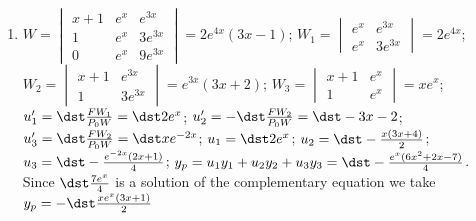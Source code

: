 \documentclass[openany]{book}
\newenvironment{sectionSolutions}{
 \begin{enumerate}[item-label={\thesection.\arabic{enumi}.}]
}{
 \end{enumerate}
}
\begin{document}
\begin{sectionSolutions}
The general solution is
$y=-\dst\frac{x^4+12}{6}+c_1x+c_2x^2+c_3e^x$, so
\[
\begin{bmatrix}y\\y'\\y''
\end{bmatrix}=-
\begin{bmatrix}
(x^4+12)/6\\2x^3/3\\2x^2
\end{bmatrix}+
\begin{vmatrix}
x&x^2&e^x\\1&2x&e^x\\0&2&e^x\end{vmatrix}
\threecol{c_1}{c_2}{c_3}.
\]
Setting $x=0$ and imposing the initial conditions yields
\[
\threecol050=
-\threecol200+\threebythree001101021\threecol{c_1}{c_2}{c_3}.
\]
Solving this system yields $c_1=3$, $c_2=-1$, $c_3=2$.
Therefore,
$y=-\dst\frac{x^4+12}{6}+3x-x^2+2e^x$.



\item
$W=\begin{vmatrix}
x+1&e^x&e^{3x}\\1&e^x&3e^{3x}\\0&e^x&9e^{3x}
\end{vmatrix}=2e^{4x}(3x-1)$;
$W_1=\begin{vmatrix}
e^x&e^{3x}\\e^x&3e^{3x}\end{vmatrix}=2e^{4x}$;
$W_2=\begin{vmatrix}
x+1&e^{3x}\\1&3e^{3x}\end{vmatrix}=e^{3x}(3x+2)$;
$W_3=\begin{vmatrix}
x+1&e^x\\1&e^x\end{vmatrix}=xe^x$;
$u_1'=\dst\frac{FW_1}{ P_0W}=\dst 2e^x$;
$u_2'=-\dst\frac{FW_2}{ P_0W}=\dst-3x-2$;
$u_3'=\dst\frac{FW_2}{ P_0W}=\dst xe^{-2x}$;
$u_1=\dst 2e^x$;
$u_2=\dst-\frac{x(3x+4)}{2}$;
$u_3=\dst-\frac{e^{-2x}(2x+1)}{4}$;
$y_p=u_1y_1+u_2y_2+u_3y_3=\dst-\frac{e^x(6x^2+2x-7)}{4}$.
Since $\dst\frac{7e^x}{4}$ is a solution of the complementary
equation we take
$y_p=-\dst\frac{xe^x(3x+1)}{2}$


\end{sectionSolutions}
\end{document}
